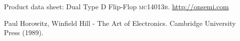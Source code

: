 \documentclass[journal, a4paper]{IEEEtran}
\begin{document}
\begin{thebibliography}{5}

	
	Product data sheet: Dual Type D Flip-Flop \textsc{mc14013b}.
	\url{http://onsemi.com}

	Paul Horowitz, Winfield Hill - The Art of Electronics. Cambridge University Press (1989).
	
\end{thebibliography}
\end{document}
